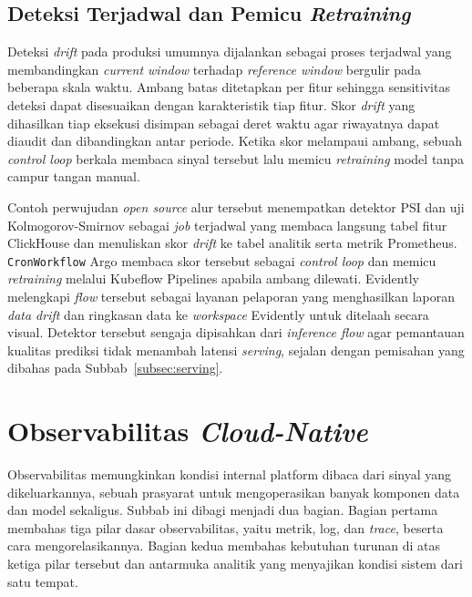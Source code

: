 \subsection{Deteksi Terjadwal dan Pemicu \textit{Retraining}}
\label{subsec:drift-loop}

Deteksi \textit{drift} pada produksi umumnya dijalankan sebagai proses terjadwal yang membandingkan \textit{current window} terhadap \textit{reference window} bergulir pada beberapa skala waktu. Ambang batas ditetapkan per fitur sehingga sensitivitas deteksi dapat disesuaikan dengan karakteristik tiap fitur. Skor \textit{drift} yang dihasilkan tiap eksekusi disimpan sebagai deret waktu agar riwayatnya dapat diaudit dan dibandingkan antar periode. Ketika skor melampaui ambang, sebuah \textit{control loop} berkala membaca sinyal tersebut lalu memicu \textit{retraining} model tanpa campur tangan manual.

Contoh perwujudan \textit{open source} alur tersebut menempatkan detektor PSI dan uji Kolmogorov-Smirnov sebagai \textit{job} terjadwal yang membaca langsung tabel fitur ClickHouse dan menuliskan skor \textit{drift} ke tabel analitik serta metrik Prometheus. \texttt{CronWorkflow} Argo membaca skor tersebut sebagai \textit{control loop} dan memicu \textit{retraining} melalui Kubeflow Pipelines apabila ambang dilewati. Evidently \autocite{evidently2025} melengkapi \textit{flow} tersebut sebagai layanan pelaporan yang menghasilkan laporan \textit{data drift} dan ringkasan data ke \textit{workspace} Evidently untuk ditelaah secara visual. Detektor tersebut sengaja dipisahkan dari \textit{inference flow} agar pemantauan kualitas prediksi tidak menambah latensi \textit{serving}, sejalan dengan pemisahan yang dibahas pada Subbab~\ref{subsec:serving}.

\section{Observabilitas \textit{Cloud-Native}}
\label{sec:observability}

Observabilitas memungkinkan kondisi internal platform dibaca dari sinyal yang dikeluarkannya, sebuah prasyarat untuk mengoperasikan banyak komponen data dan model sekaligus. Subbab ini dibagi menjadi dua bagian. Bagian pertama membahas tiga pilar dasar observabilitas, yaitu metrik, log, dan \textit{trace}, beserta cara mengorelasikannya. Bagian kedua membahas kebutuhan turunan di atas ketiga pilar tersebut dan antarmuka analitik yang menyajikan kondisi sistem dari satu tempat.

